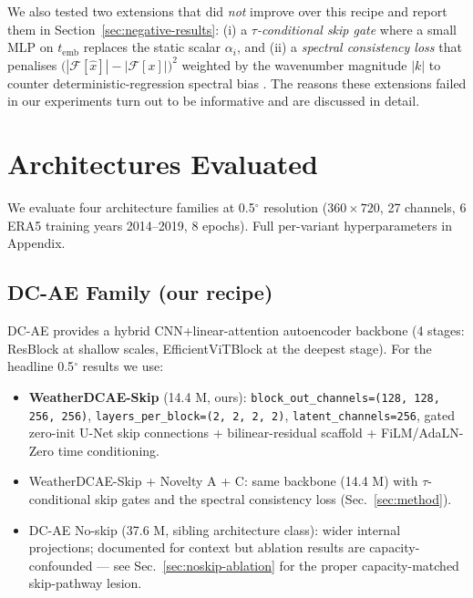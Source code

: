 \documentclass[10pt,letterpaper,twocolumn]{article}
\begin{document}
We also tested two extensions that did \emph{not} improve over this
recipe and report them in Section~\ref{sec:negative-results}: (i) a
\emph{$\tau$-conditional skip gate} where a small MLP on $t_\text{emb}$
replaces the static scalar $\alpha_i$, and (ii) a \emph{spectral
consistency loss} that penalises $\bigl(|\mathcal{F}[\hat x]|{-}|\mathcal{F}[x]|\bigr)^2$
weighted by the wavenumber magnitude $|k|$ to counter
deterministic-regression spectral bias
\cite{lindborg1999can,nastrom1985climatology}. The reasons these
extensions failed in our experiments turn out to be informative and are
discussed in detail.

\section{Architectures Evaluated}

We evaluate four architecture families at 0.5$^\circ$ resolution
($360{\times}720$, 27 channels, 6 ERA5 training years 2014--2019, 8 epochs).
Full per-variant hyperparameters in Appendix.

\subsection{DC-AE Family (our recipe)}

DC-AE \cite{xie2024dcae} provides a hybrid CNN+linear-attention autoencoder
backbone (4 stages: ResBlock at shallow scales, EfficientViTBlock at the
deepest stage). For the headline 0.5$^\circ$ results we use:

\begin{itemize}
\item \textbf{WeatherDCAE-Skip} (14.4 M, ours):
      \texttt{block\_out\_channels=(128, 128, 256, 256)},
      \texttt{layers\_per\_block=(2, 2, 2, 2)}, \texttt{latent\_channels=256},
      gated zero-init U-Net skip connections + bilinear-residual scaffold +
      FiLM/AdaLN-Zero time conditioning.
\item WeatherDCAE-Skip + Novelty A + C: same backbone (14.4 M) with
      $\tau$-conditional skip gates and the spectral consistency loss
      (Sec.~\ref{sec:method}).
\item DC-AE No-skip (37.6 M, sibling architecture class): wider internal
      projections; documented for context but ablation results are
      capacity-confounded — see Sec.~\ref{sec:noskip-ablation} for the proper
      capacity-matched skip-pathway lesion.
\end{itemize}
\end{document}
